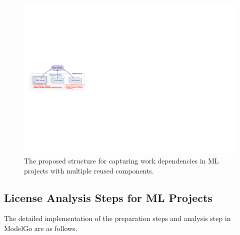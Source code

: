 \begin{figure}[t]
    \centering
    \includegraphics[width=\linewidth]{fig/structure.pdf}
    \caption{The proposed structure for capturing work dependencies in ML projects with multiple reused components.}
    \Description{}
    \label{fig:stru}
\end{figure}

\subsection{License Analysis Steps for ML Projects}

The detailed implementation of the preparation steps and analysis step in ModelGo are as follows.

